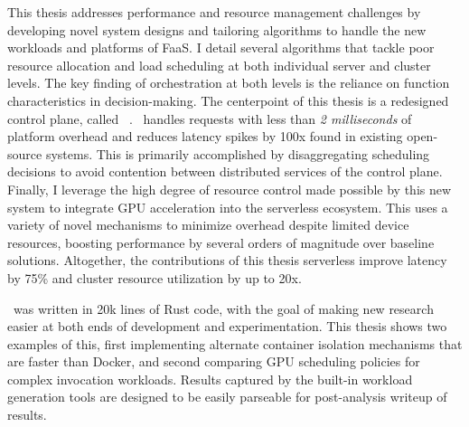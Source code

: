 \documentclass[pageno]{jpaper}
\begin{document}
This thesis addresses performance and resource management challenges by developing novel system designs and tailoring algorithms to handle the new workloads and platforms of FaaS.
I detail several algorithms that tackle poor resource allocation and load scheduling at both individual server and cluster levels.
The key finding of orchestration at both levels is the reliance on function characteristics in decision-making.
The centerpoint of this thesis is a redesigned control plane, called \sysname~\cite{fuerst2023iluvatar}.
\sysname~handles requests with less than \textit{2 milliseconds} of platform overhead and reduces latency spikes by 100x found in existing open-source systems.
This is primarily accomplished by disaggregating scheduling decisions to avoid contention between distributed services of the control plane.
Finally, I leverage the high degree of resource control made possible by this new system to integrate GPU acceleration into the serverless ecosystem.
This uses a variety of novel mechanisms to minimize overhead despite limited device resources, boosting performance by several orders of magnitude over baseline solutions.
Altogether, the contributions of this thesis serverless improve latency by 75\% and cluster resource utilization by up to 20x.

\sysname~was written in 20k lines of Rust code, with the goal of making new research easier at both ends of development and experimentation.
This thesis shows two examples of this, first implementing alternate container isolation mechanisms that are faster than Docker, and second comparing GPU scheduling policies for complex invocation workloads.
Results captured by the built-in workload generation tools are designed to be easily parseable for post-analysis writeup of results.



\end{document}
